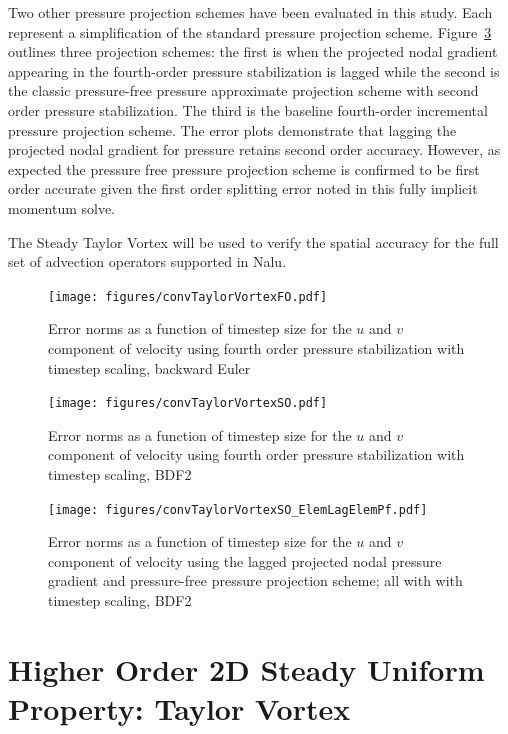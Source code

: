 Two other pressure projection schemes have been evaluated in this study. Each represent a 
simplification of the standard pressure projection scheme. Figure~\ref{fig:hybridTstep} outlines
three projection schemes: the first is when the projected nodal gradient appearing in the fourth-order 
pressure stabilization is lagged while the second is the classic pressure-free pressure approximate projection 
scheme with second order pressure stabilization. The third is the baseline fourth-order incremental pressure projection 
scheme. The error plots demonstrate that lagging the projected nodal 
gradient for pressure retains second order accuracy. However, as expected the pressure
free pressure projection scheme is confirmed to be first order accurate given the first order splitting error noted in this fully implicit momentum solve.

The Steady Taylor Vortex will be used to verify the spatial accuracy for the full set of advection
operators supported in Nalu.
 
\begin{figure}
\centerline{\texttt{[image: figures/convTaylorVortexFO.pdf]}}
\caption{Error norms as a function of timestep size for the $u$ and $v$
component of velocity using fourth order pressure stabilization with timestep scaling, backward Euler}
\label{fig:fo4thTstep}
\end{figure}

\begin{figure}
\centerline{\texttt{[image: figures/convTaylorVortexSO.pdf]}}
\caption{Error norms as a function of timestep size for the $u$ and $v$
component of velocity using fourth order pressure stabilization with timestep scaling, BDF2}
\label{fig:so4thTstep}
\end{figure}

\begin{figure}
\centerline{\texttt{[image: figures/convTaylorVortexSO\_ElemLagElemPf.pdf]}}
\caption{Error norms as a function of timestep size for the $u$ and $v$
component of velocity using the lagged projected nodal pressure gradient and pressure-free pressure projection scheme; all with with timestep scaling, BDF2}
\label{fig:hybridTstep}
\end{figure}

\section{Higher Order 2D Steady Uniform Property: Taylor Vortex}

